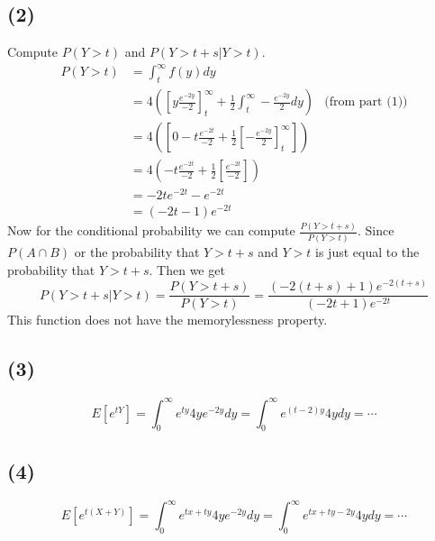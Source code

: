 \documentclass{article}
\theoremstyle{definition}
\begin{document}
    \subsection*{(2)}
        Compute $P(Y > t)$ and $P(Y > t + s | Y > t)$.
        \begin{align*}
            P(Y > t) &= \int_t^\infty f(y) dy \\
            &= 4\left(\left[y \frac{e^{-2y}}{-2} \right]_t^\infty + \frac{1}{2} \int_t^\infty -\frac{e^{-2y}}{2} dy\right) & \text{(from part (1))}\\
            &= 4\left( \left[0 - t \frac{e^{-2t}}{-2} + \frac{1}{2} \left[-\frac{e^{-2y}}{2}\right]_t^\infty \right]\right)\\
            &= 4\left(-t \frac{e^{-2t}}{-2} + \frac{1}{2}\left[\frac{e^{-2t}}{-2}\right]\right)\\
            &= -2te^{-2t} -e^{-2t}\\
            &= (-2t - 1)e^{-2t}
        \end{align*}
        Now for the conditional probability we can compute $\frac{P(Y > t+s)}{P(Y > t)}$. Since $P(A \cap B)$ or the probability that $Y > t+s$ and $Y > t$ is
        just equal to the probability that $Y > t + s$. Then we get 
        \[
            P(Y > t + s | Y > t) = \frac{P(Y > t+s)}{P(Y > t)} = \frac{(-2(t+s) + 1)e^{-2(t+s)}}{(-2t + 1)e^{-2t}}
        \]
        This function does not have the memorylessness property.
    \subsection*{(3)}
    \[
        E[e^{tY}] = \int_0^\infty e^{ty} 4ye^{-2y} dy = \int_0^\infty e^{(t - 2)y} 4y dy = \cdots
    \]
    \subsection*{(4)}
    \[
        E[e^{t(X+Y)}] = \int_0^\infty e^{tx + ty} 4ye^{-2y} dy = \int_0^\infty e^{tx + ty - 2y} 4y dy = \cdots
    \]
\end{document}
